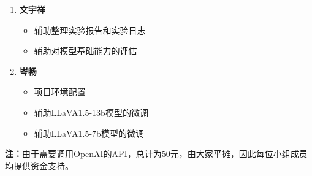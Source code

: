 \documentclass[
    linespread = 1.25
]{ctexart}
\begin{document}
\begin{enumerate}
  \item \textbf{文宇祥}
        \begin{itemize}
          \item 辅助整理实验报告和实验日志
          \item 辅助对模型基础能力的评估
        \end{itemize}
        
  \item \textbf{岑畅}
        \begin{itemize}
          \item 项目环境配置
          \item 辅助LLaVA1.5-13b模型的微调
          \item 辅助LLaVA1.5-7b模型的微调
        \end{itemize}
\end{enumerate}

\textbf{注：}由于需要调用OpenAI的API，总计为50元，由大家平摊，因此每位小组成员均提供资金支持。


\end{document}
